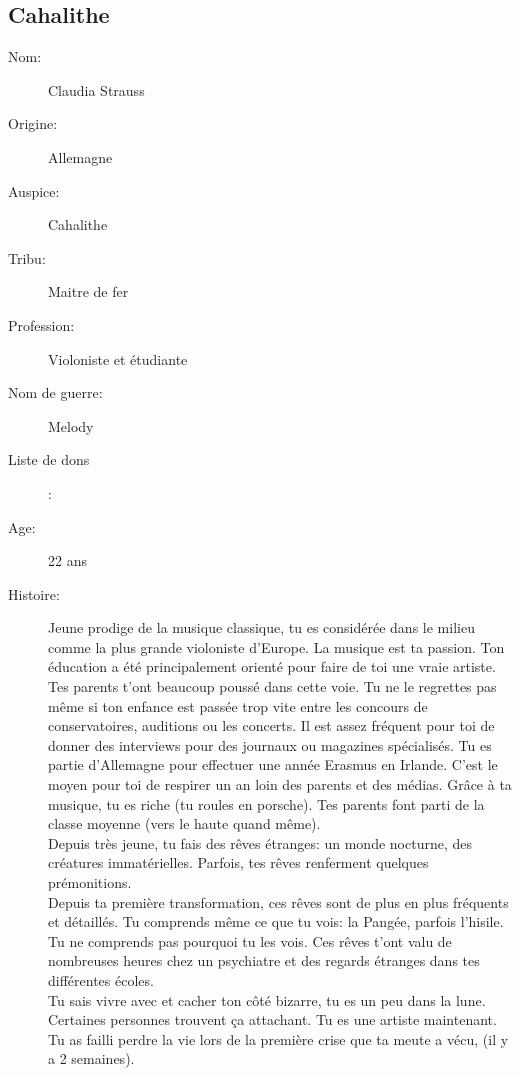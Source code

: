 \documentclass[oneside,12pt]{book}
\begin{document}
\begin{flushleft}
\section{Cahalithe}
\begin{description}
\item[Nom:]{Claudia Strauss}
\item[Origine:]{Allemagne}
\item[Auspice:]{Cahalithe}
\item[Tribu:]{Maitre de fer}
\item[Profession:]{Violoniste et étudiante}
\item[Nom de guerre:]{Melody}
\item[Liste de dons]:
\item[Age:]{22 ans}
\item[Histoire:]{
Jeune prodige de la musique classique, tu es considérée dans le milieu comme la plus grande violoniste d'Europe. La musique est ta passion. Ton éducation a été principalement orienté pour faire de toi une vraie artiste. Tes parents t'ont beaucoup poussé dans cette voie. Tu ne le regrettes pas même si ton enfance est passée trop vite entre les concours de conservatoires, auditions ou les concerts. Il est assez fréquent pour toi de donner des interviews pour des journaux ou magazines spécialisés. Tu es partie d'Allemagne pour effectuer une année Erasmus en Irlande. C'est le moyen pour toi de respirer un an loin des parents et des médias. Grâce à ta musique, tu es riche (tu roules en porsche). Tes parents font parti de la classe moyenne (vers le haute quand même). \\ 
Depuis très jeune, tu fais des rêves étranges:  un monde nocturne, des créatures immatérielles. Parfois, tes rêves renferment quelques  prémonitions. \\ 
Depuis ta première transformation, ces rêves sont de plus en plus fréquents et détaillés. Tu comprends même ce que tu vois: la Pangée, parfois l'hisile. Tu ne comprends pas pourquoi tu les vois. Ces rêves t'ont valu de nombreuses heures chez un psychiatre et des regards étranges dans tes différentes écoles.\\ 

Tu sais vivre avec et cacher ton côté bizarre, tu es un peu dans la lune. Certaines personnes trouvent ça attachant. Tu es une artiste maintenant. Tu as failli perdre la vie lors de la première crise que ta meute a vécu, (il y a 2 semaines).\\ 

}
\end{description}
\end{flushleft}
\end{document}
